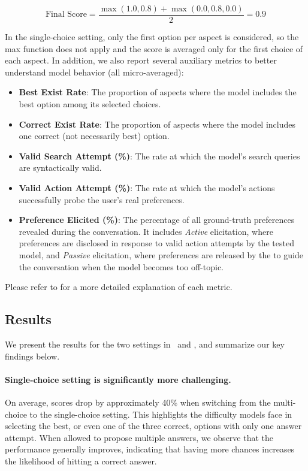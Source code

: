 \begin{small}
\[
\text{Final Score} = \frac{\max(1.0, 0.8) + \max(0.0, 0.8, 0.0)}{2} = 0.9
\]
\end{small}

In the single-choice setting, only the first option per aspect is considered, so the max function does not apply and the score is averaged only for the first choice of each aspect. In addition, we also report several auxiliary metrics to better understand model behavior (all micro-averaged):
\begin{itemize}[topsep=2pt, partopsep=-3pt, leftmargin=8pt, itemsep=0pt]
\item \textbf{Best Exist Rate}: The proportion of aspects where the model includes the best option among its selected choices.
\item \textbf{Correct Exist Rate}: The proportion of aspects where the model includes one correct (not necessarily best) option.
\item \textbf{Valid Search Attempt (\%)}: The rate at which the model's search queries are syntactically valid.
\item \textbf{Valid Action Attempt (\%)}: The rate at which the model's actions successfully probe the user’s real preferences.
\item \textbf{Preference Elicited (\%)}: The percentage of all ground-truth preferences revealed during the conversation. It includes \textit{Active} elicitation, where preferences are disclosed in response to valid action attempts by the tested model, and \textit{Passive} elicitation, where preferences are released by the {\gymname} to guide the conversation when the model becomes too off-topic.
\end{itemize}
Please refer to  for a more detailed explanation of each metric.


\subsection{Results}

We present the results for the two settings in~ and , and summarize our key findings below.

\paragraph{Single-choice setting is significantly more challenging.}
On average, scores drop by approximately 40\% when switching from the multi-choice to the single-choice setting. This highlights the difficulty models face in selecting the best, or even one of the three correct, options with only one answer attempt. When allowed to propose multiple answers, we observe that the performance generally improves, indicating that having more chances increases the likelihood of hitting a correct answer.

